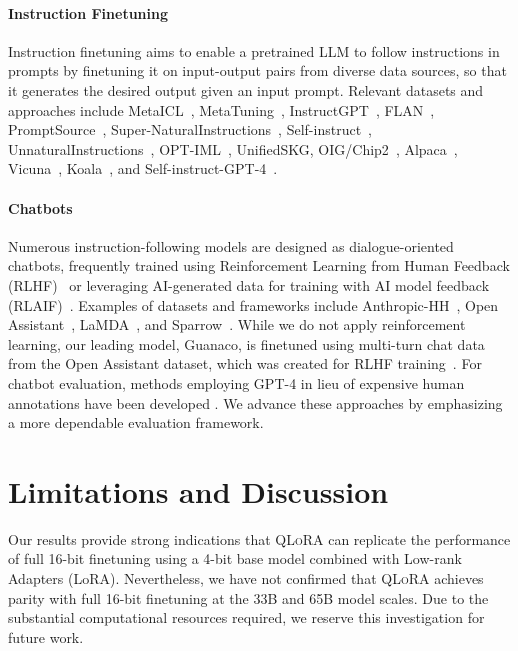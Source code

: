 \paragraph{Instruction Finetuning} Instruction finetuning aims to enable a pretrained LLM to follow instructions in prompts by finetuning it on input-output pairs from diverse data sources, so that it generates the desired output given an input prompt. Relevant datasets and approaches include MetaICL~\citep{min2021metaicl}, MetaTuning~\citep{zhong2021adapting}, InstructGPT~\citep{ouyang2022training}, FLAN~\citep{wei2021finetuned,chung2022scaling}, PromptSource~\citep{bach2022promptsource}, Super-NaturalInstructions~\citep{wang2022super,sanh2021multitask}, Self-instruct~\citep{wang2022self}, UnnaturalInstructions~\citep{honovich2022unnatural}, OPT-IML~\citep{iyer2022opt}, UnifiedSKG\citep{xie2022unifiedskg}, OIG/Chip2~\citep{laion2023}, Alpaca~\citep{alpaca}, Vicuna~\citep{vicuna2023}, Koala~\citep{koala_blogpost_2023}, and Self-instruct-GPT-4~\citep{peng2023instruction}.

\paragraph{Chatbots} Numerous instruction-following models are designed as dialogue-oriented chatbots, frequently trained using Reinforcement Learning from Human Feedback (RLHF)~\citep{christiano2017deep} or leveraging AI-generated data for training with AI model feedback (RLAIF)~\citep{bai2022constitutional}. Examples of datasets and frameworks include Anthropic-HH~\citep{askell2021general,bai2022training}, Open Assistant~\citep{kopf2023openassistant}, LaMDA~\citep{thoppilan2022lamda}, and Sparrow~\citep{glaese2022improving}. While we do not apply reinforcement learning, our leading model, Guanaco, is finetuned using multi-turn chat data from the Open Assistant dataset, which was created for RLHF training~\citep{kopf2023openassistant}. For chatbot evaluation, methods employing GPT-4 in lieu of expensive human annotations have been developed \citep{vicuna2023,peng2023instruction}. We advance these approaches by emphasizing a more dependable evaluation framework.

\section{Limitations and Discussion}

Our results provide strong indications that \textsc{QLoRA} can replicate the performance of full 16-bit finetuning using a 4-bit base model combined with Low-rank Adapters (LoRA). Nevertheless, we have not confirmed that \textsc{QLoRA} achieves parity with full 16-bit finetuning at the 33B and 65B model scales. Due to the substantial computational resources required, we reserve this investigation for future work.

